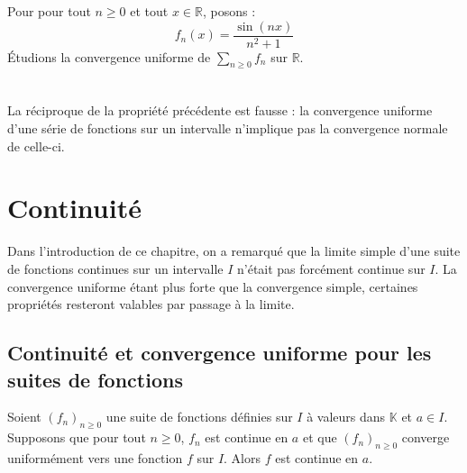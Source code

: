 \documentclass[a4paper,10pt]{report}
\begin{document}
\begin{Exemple} Pour pour tout $n \geq 0$ et tout $x \in \mathbb{R}$, posons :
$$ f_n(x) = \frac{\sin(nx)}{n^2+1}$$
Étudions la convergence uniforme de $\sum_{n \geq 0} f_n$ sur $\mathbb{R}$.

\newpage
$\phantom{test}$
\medskip
%

\vspace{7cm}
\end{Exemple}

\begin{Remarque}{} La réciproque de la propriété précédente est fausse : la convergence uniforme d'une série de fonctions sur un intervalle n'implique pas la convergence normale de celle-ci.
\end{Remarque}

\section{Continuité}

Dans l'introduction de ce chapitre, on a remarqué que la limite simple d'une suite de fonctions continues sur un intervalle $I$ n'était pas forcément continue sur $I$. La convergence uniforme étant plus \og forte \fg que la convergence simple, certaines propriétés resteront valables par passage à la limite.

\subsection{Continuité et convergence uniforme pour les suites de fonctions}

\begin{Theoreme}{}\label{segment}
Soient $(f_n)_{n \geq 0}$ une suite de fonctions définies sur $I$ à valeurs dans $\mathbb{K}$ et $a \in I$. Supposons que pour tout $n \geq 0$, $f_n$ est continue en $a$ et que $(f_n)_{n \geq 0}$ converge uniformément vers une fonction $f$ sur $I$. Alors $f$ est continue en $a$.
\end{Theoreme}
\end{document}
